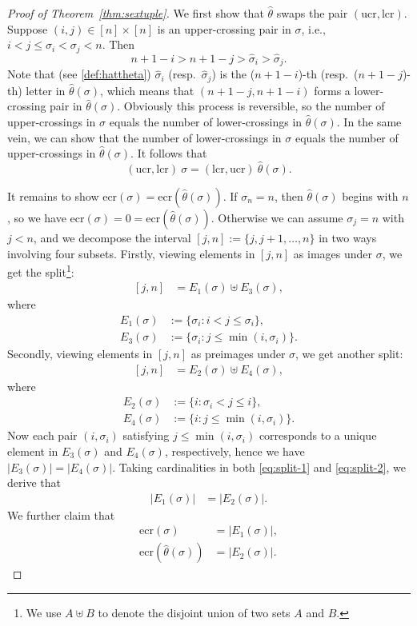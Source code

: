 \documentclass[12pt,reqno]{amsart}
\numberwithin{equation}{section}
\theoremstyle{plain}
\theoremstyle{definition}
\def\ucr{\mathrm{ucr}}
\def\ecr{\mathrm{ecr}}
\def\lcr{\mathrm{lcr}}
\begin{document}
\begin{proof}[Proof of Theorem~\ref{thm:sextuple}]
We first show that $\hat{\theta}$ swaps the pair $(\ucr,\lcr)$. Suppose $(i,j)\in[n]\times[n]$ is an upper-crossing pair in $\sigma$, i.e., $i<j\le\sigma_i<\sigma_j<n$. Then
$$n+1-i>n+1-j>\hat{\sigma}_i>\hat{\sigma}_j.$$
Note that (see \eqref{def:hattheta}) $\hat{\sigma}_i$ (resp.~$\hat{\sigma}_j$) is the ($n+1-i$)-th (resp.~($n+1-j$)-th) letter in $\hat{\theta}(\sigma)$, which means that $(n+1-j,n+1-i)$ forms a lower-crossing pair in $\hat{\theta}(\sigma)$. Obviously this process is reversible, so the number of upper-crossings in $\sigma$ equals the number of lower-crossings in $\hat{\theta}(\sigma)$. In the same vein, we can show that the number of lower-crossings in $\sigma$ equals the number of upper-crossings in $\hat{\theta}(\sigma)$. It follows that
$$(\ucr,\lcr)\: \sigma = (\lcr,\ucr)\: \hat{\theta}(\sigma).$$

It remains to show $\ecr(\sigma)=\ecr(\hat{\theta}(\sigma))$. If $\sigma_n=n$, then $\hat{\theta}(\sigma)$ begins with $n$, so we have $\ecr(\sigma)=0=\ecr(\hat{\theta}(\sigma))$. Otherwise we can assume $\sigma_j=n$ with $j<n$, and we decompose the interval $[j,n]:=\{j,j+1,\ldots,n\}$ in two ways involving four subsets. Firstly, viewing elements in $[j,n]$ as images under $\sigma$, we get the split\footnote{We use $A\uplus B$ to denote the disjoint union of two sets $A$ and $B$.}:
\begin{align}\label{eq:split-1}
[j,n] &= E_1(\sigma)\uplus E_3(\sigma),
\end{align}
where
\begin{align*}
E_1(\sigma) &:= \{\sigma_i:i<j\le\sigma_i\},\\
E_3(\sigma) &:= \{\sigma_i:j\le\min(i,\sigma_i)\}.
\end{align*}
Secondly, viewing elements in $[j,n]$ as preimages under $\sigma$, we get another split:
\begin{align}\label{eq:split-2}
[j,n] &= E_2(\sigma)\uplus E_4(\sigma),
\end{align}
where
\begin{align*}
E_2(\sigma) &:= \{i:\sigma_i< j\le i\},\\
E_4(\sigma) &:= \{i:j\le\min(i,\sigma_i)\}.
\end{align*}
Now each pair $(i,\sigma_i)$ satisfying $j\le\min(i,\sigma_i)$ corresponds to a unique element in $E_3(\sigma)$ and $E_4(\sigma)$, respectively, hence we have $|E_3(\sigma)|=|E_4(\sigma)|$. Taking cardinalities in both \eqref{eq:split-1} and \eqref{eq:split-2}, we derive that
\begin{align}
|E_1(\sigma)| &=|E_2(\sigma)|.\label{eq:E1=E2}
\end{align}
We further claim that
\begin{align}
\ecr(\sigma) &= |E_1(\sigma)|,\label{eq:E1}\\
\ecr(\hat{\theta}(\sigma)) &= |E_2(\sigma)|.\label{eq:E2}
\end{align}



\end{proof}
\end{document}
